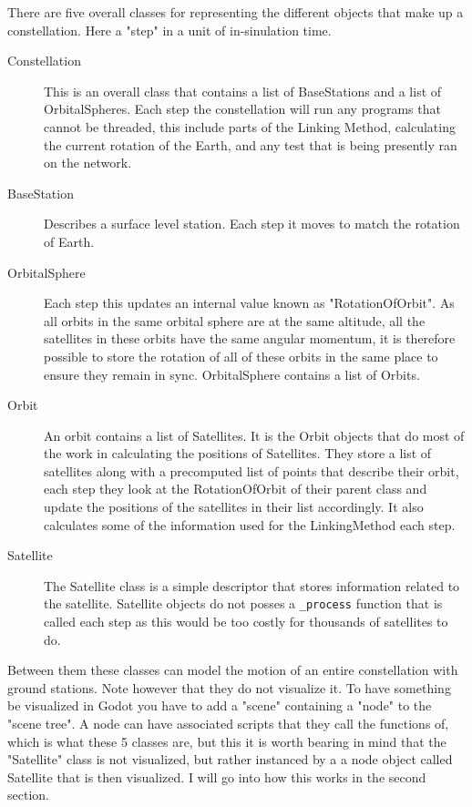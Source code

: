 \documentclass[12pt,a4paper,twoside,openright]{report}
\begin{document}
There are five overall classes for representing the different objects that make up a constellation. Here a "step" in a unit of in-sinulation time.

\begin{description}
\item[Constellation] This is an overall class that contains a list of BaseStations and a list of OrbitalSpheres. Each step the constellation will run any programs that cannot be threaded, this include parts of the Linking Method, calculating the current rotation of the Earth, and any test that is being presently ran on the network.
\item[BaseStation] Describes a surface level station. Each step it moves to match the rotation of Earth.
\item[OrbitalSphere] Each step this updates an internal value known as "RotationOfOrbit". As all orbits in the same orbital sphere are at the same altitude, all the satellites in these orbits have the same angular momentum, it is therefore possible to store the rotation of all of these orbits in the same place to ensure they remain in sync. OrbitalSphere contains a list of Orbits.
\item[Orbit] An orbit contains a list of Satellites. It is the Orbit objects that do most of the work in calculating the positions of Satellites. They store a list of satellites along with a precomputed list of points that describe their orbit, each step they look at the RotationOfOrbit of their parent class and update the positions of the satellites in their list accordingly. It also calculates some of the information used for the LinkingMethod each step.
\item[Satellite] The Satellite class is a simple descriptor that stores information related to the satellite. Satellite objects do not posses a \lstinline{_process} function that is called each step as this would be too costly for thousands of satellites to do.
\end{description}

Between them these classes can model the motion of an entire constellation with ground stations. Note however that they do not visualize it. To have something be visualized in Godot you have to add a "scene" containing a "node" to the "scene tree". A node can have associated scripts that they call the functions of, which is what these 5 classes are, but this it is worth bearing in mind that the "Satellite" class is not visualized, but rather instanced by a a node object called Satellite that is then visualized. I will go into how this works in the second section.
\end{document}
